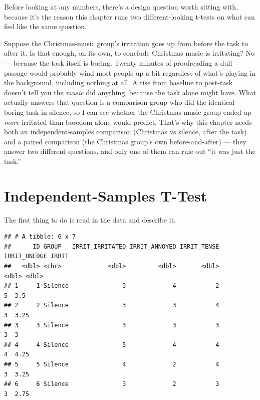 \documentclass[
]{book}
\begin{document}
Before looking at any numbers, there's a design question worth sitting with, because it's the reason this chapter runs two different-looking t-tests on what can feel like the same question.

Suppose the Christmas-music group's irritation goes up from before the task to after it. Is that enough, on its own, to conclude Christmas music is irritating? No --- because the task itself is boring. Twenty minutes of proofreading a dull passage would probably wind most people up a bit regardless of what's playing in the background, including nothing at all. A rise from baseline to post-task doesn't tell you the \emph{music} did anything, because the task alone might have. What actually answers that question is a comparison group who did the identical boring task in silence, so I can see whether the Christmas-music group ended up \emph{more} irritated than boredom alone would predict. That's why this chapter needs both an independent-samples comparison (Christmas vs silence, after the task) and a paired comparison (the Christmas group's own before-and-after) --- they answer two different questions, and only one of them can rule out ``it was just the task.''

\section{Independent-Samples T-Test}\label{independent-samples-t-test}

The first thing to do is read in the data and describe it.

\begin{verbatim}
## # A tibble: 6 x 7
##      ID GROUP   IRRIT_IRRITATED IRRIT_ANNOYED IRRIT_TENSE IRRIT_ONEDGE IRRIT
##   <dbl> <chr>             <dbl>         <dbl>       <dbl>        <dbl> <dbl>
## 1     1 Silence               3             4           2            5  3.5 
## 2     2 Silence               3             3           4            3  3.25
## 3     3 Silence               3             3           3            3  3   
## 4     4 Silence               5             4           4            4  4.25
## 5     5 Silence               4             2           4            3  3.25
## 6     6 Silence               3             2           3            3  2.75
\end{verbatim}
\end{document}
